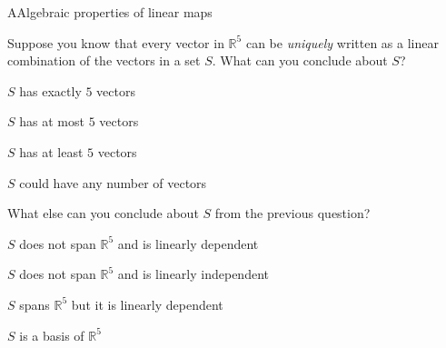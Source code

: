 \documentclass{article}
\newcommand{\IR}{\mathbb{R}}
\begin{document}
\begin{module}{A}{Algebraic properties of linear maps}
\begin{readinessAssuranceTest}
\item Suppose you know that every vector in \(\IR^5\) can be \textit{uniquely}
      written as a linear combination of 
      the vectors in a set \(S\).  What can you conclude about \(S\)?
\begin{readinessAssuranceTestChoices}
\item \(S\) has exactly \(5\) vectors
\item \(S\) has at most \(5\) vectors
\item \(S\) has at least \(5\) vectors
\item \(S\) could have any number of vectors
\end{readinessAssuranceTestChoices}

\item What else can you conclude about \(S\) from the previous question?
\begin{readinessAssuranceTestChoices}
\item \(S\) does not span \(\IR^5\) and is linearly dependent
\item \(S\) does not span \(\IR^5\) and is linearly independent
\item \(S\) spans \(\IR^5\) but it is linearly dependent
\item \(S\) is a basis of \(\IR^5\)
\end{readinessAssuranceTestChoices}

\end{readinessAssuranceTest}
\end{module}
\end{document}

